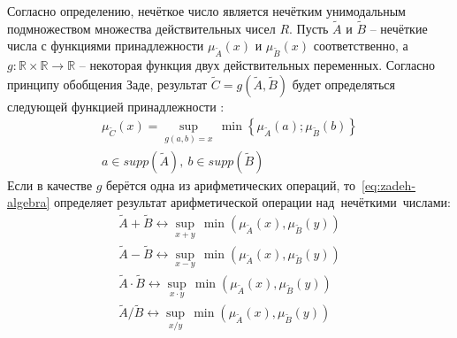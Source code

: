 Согласно определению, нечёткое число является нечётким унимодальным подмножеством множества действительных чисел $R$. Пусть $\tilde{A}$ и $\tilde{B}$ – нечёткие числа с функциями принадлежности ${{\mu }_{{\tilde{A}}}}\left( x \right)$ и ${{\mu }_{{\tilde{B}}}}\left( x \right)$ соответственно, а $g:\mathbb{R}\times \mathbb{R}\to \mathbb{R}$ – некоторая функция двух действительных переменных. Согласно принципу обобщения Заде, результат $\tilde{C}=g\left( \tilde{A},\tilde{B} \right)$ будет определяться следующей функцией принадлежности \cite{Borisov_Alexeev_Msk, Pospelov, Rutkovskaya, Yakhyaeva}:
\begin{equation}
\label{eq:zadeh-algebra}
	\begin{matrix}
		\mu_{\tilde C}\left( x \right)=\underset{g\left( a,b \right)=x}{\mathop{\sup }}{}\,\min \left\{ {{\mu }_{{\tilde{A}}}}\left( a \right);{{\mu }_{{\tilde{B}}}}\left( b \right) \right\} \\ 
		  a\in supp\left( {\tilde{A}} \right),\ b\in supp\left( {\tilde{B}} \right) 
	\end{matrix}
\end{equation}
Если в качестве $g$ берётся одна из арифметических операций, то~\eqref{eq:zadeh-algebra} определяет результат арифметической операции над~нечёткими~числами:
\begin{gather*}
		\tilde{A}+\tilde{B} \leftrightarrow \underset{x+y}{\mathop{\sup }}\,\min \left( {{\mu }_{{\tilde{A}}}}\left( x \right),{{\mu }_{{\tilde{B}}}}\left( y \right) \right) \\
		\tilde{A}-\tilde{B} \leftrightarrow \underset{x-y}{\mathop{\sup }}\,\min \left( {{\mu }_{{\tilde{A}}}}\left( x \right),{{\mu }_{{\tilde{B}}}}\left( y \right) \right) \\
		\tilde{A}\cdot \tilde{B} \leftrightarrow \underset{x\cdot y}{\mathop{\sup }}\,\min \left( {{\mu }_{{\tilde{A}}}}\left( x \right),{{\mu }_{{\tilde{B}}}}\left( y \right) \right) \\
		\tilde{A}/\tilde{B} \leftrightarrow \underset{x/y}{\mathop{\sup }}\,\min \left( {{\mu }_{{\tilde{A}}}}\left( x \right),{{\mu }_{{\tilde{B}}}}\left( y \right) \right) 
\end{gather*}

